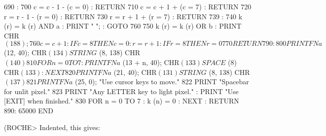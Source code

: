         690 :
        700 c = c - 1 - (c = 0) : RETURN
        710 c = c + 1 + (c = 7) : RETURN
        720 r = r - 1 - (r = 0) : RETURN
        730 r = r + 1 + (r = 7) : RETURN
        739 :
        740 k (r) = k (r) AND a : PRINT " "; : GOTO 760
        750 k (r) = k (r) OR b : PRINT CHR$ (188);
        760 c = c + 1 : IF c = 8 THEN c = 0 : r = r + 1 : IF r = 8 THEN r = 0
        770 RETURN
        790 :
        800 PRINT FN a$ (12, 40); CHR$ (134) STRING$ (8, 138) CHR$ (140)
        810  FOR n = 0 TO 7: PRINT FN a$ (13 + n, 40); CHR$ (133)  SPACE$  (8) 
CHR$ (133) : NEXT
        820 PRINT FN a$ (21, 40); CHR$ (131) STRING$ (8, 138) CHR$ (137)
        821 PRINT FN a$ (25, 0); "Use cursor keys to move."
        822 PRINT "Spacebar for unlit pixel."
        823  PRINT "Any LETTER key to light pixel." : PRINT "Use  [EXIT]  when 
finished."
        830 FOR n = 0 TO 7 : k (n) = 0 : NEXT : RETURN
        890:
        65000 END

(ROCHE> Indented, this gives:

